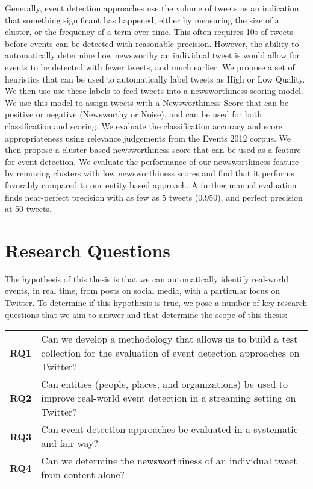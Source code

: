 Generally, event detection approaches use the volume of tweets as an indication that something significant has happened, either by measuring the size of a cluster, or the frequency of a term over time.
This often requires 10s of tweets before events can be detected with reasonable precision.
However, the ability to automatically determine how newsworthy an individual tweet is would allow for events to be detected with fewer tweets, and much earlier.
We propose a set of heuristics that can be used to automatically label tweets as High or Low Quality.
We then use use these labels to feed tweets into a newsworthiness scoring model.
We use this model to assign tweets with a Newsworthiness Score that can be positive or negative (Newsworthy or Noise), and can be used for both classification and scoring.
We evaluate the classification accuracy and score appropriateness using relevance judgements from the Events 2012 corpus.
We then propose a cluster based newsworthiness score that can be used as a feature for event detection.
We evaluate the performance of our newsworthiness feature by removing clusters with low newsworthiness scores and find that it performs favorably compared to our entity based approach.
A further manual evaluation finds near-perfect precision with as few as 5 tweets (0.950), and perfect precision at 50 tweets.

\section{Research Questions}
The hypothesis of this thesis is that we can automatically identify real-world events, in real time, from posts on social media, with a particular focus on Twitter.
To determine if this hypothesis is true, we pose a number of key research questions that we aim to answer and that determine the scope of this thesis:

\begin{tabulary}{\textwidth}{l L}
\textbf{RQ1} & Can we develop a methodology that allows us to build a test collection for the evaluation of event detection approaches on Twitter? \\

\textbf{RQ2} & Can entities (people, places, and organizations) be used to improve real-world event detection in a streaming setting on Twitter? \\

\textbf{RQ3} & Can event detection approaches be evaluated in a systematic and fair way? \\

\textbf{RQ4} & Can we determine the newsworthiness of an individual tweet from content alone? \\
\end{tabulary}

